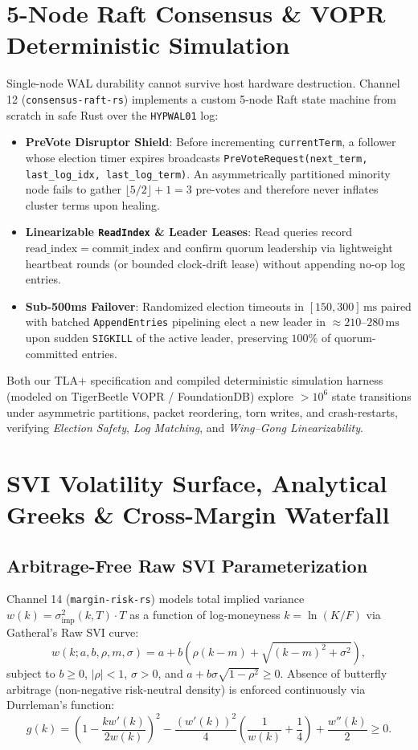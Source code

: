 \documentclass[10pt,twocolumn]{article}
\begin{document}
\section{5-Node Raft Consensus \& VOPR Deterministic Simulation}
Single-node WAL durability cannot survive host hardware destruction. Channel 12 (\texttt{consensus-raft-rs}) implements a custom 5-node Raft state machine from scratch in safe Rust over the \texttt{HYPWAL01} log:
\begin{itemize}
  \item \textbf{PreVote Disruptor Shield}: Before incrementing \texttt{currentTerm}, a follower whose election timer expires broadcasts \texttt{PreVoteRequest(next\_term, last\_log\_idx, last\_log\_term)}. An asymmetrically partitioned minority node fails to gather $\lfloor 5/2 \rfloor + 1 = 3$ pre-votes and therefore never inflates cluster terms upon healing.
  \item \textbf{Linearizable \texttt{ReadIndex} \& Leader Leases}: Read queries record $\mathrm{read\_index} = \mathrm{commit\_index}$ and confirm quorum leadership via lightweight heartbeat rounds (or bounded clock-drift lease) without appending no-op log entries.
  \item \textbf{Sub-500ms Failover}: Randomized election timeouts in $[150, 300]\,\text{ms}$ paired with batched \texttt{AppendEntries} pipelining elect a new leader in $\approx 210\text{--}280\,\text{ms}$ upon sudden \texttt{SIGKILL} of the active leader, preserving $100\%$ of quorum-committed entries.
\end{itemize}
Both our TLA+ specification and compiled deterministic simulation harness (modeled on TigerBeetle VOPR / FoundationDB) explore $>10^6$ state transitions under asymmetric partitions, packet reordering, torn writes, and crash-restarts, verifying \emph{Election Safety}, \emph{Log Matching}, and \emph{Wing--Gong Linearizability}.

\section{SVI Volatility Surface, Analytical Greeks \& Cross-Margin Waterfall}
\subsection{Arbitrage-Free Raw SVI Parameterization}
Channel 14 (\texttt{margin-risk-rs}) models total implied variance $w(k) = \sigma_{\text{imp}}^2(k, T) \cdot T$ as a function of log-moneyness $k = \ln(K / F)$ via Gatheral's Raw SVI curve:
\begin{equation}
  w(k; a, b, \rho, m, \sigma) = a + b\left( \rho(k - m) + \sqrt{(k - m)^2 + \sigma^2} \right), \label{eq:svi}
\end{equation}
subject to $b \ge 0$, $|\rho| < 1$, $\sigma > 0$, and $a + b\sigma\sqrt{1 - \rho^2} \ge 0$. Absence of butterfly arbitrage (non-negative risk-neutral density) is enforced continuously via Durrleman's function:
\begin{equation}
  g(k) = \left(1 - \frac{k w'(k)}{2 w(k)}\right)^{\!2} - \frac{(w'(k))^2}{4}\!\left(\frac{1}{w(k)} + \frac{1}{4}\right) + \frac{w''(k)}{2} \ge 0.
\end{equation}
\end{document}

